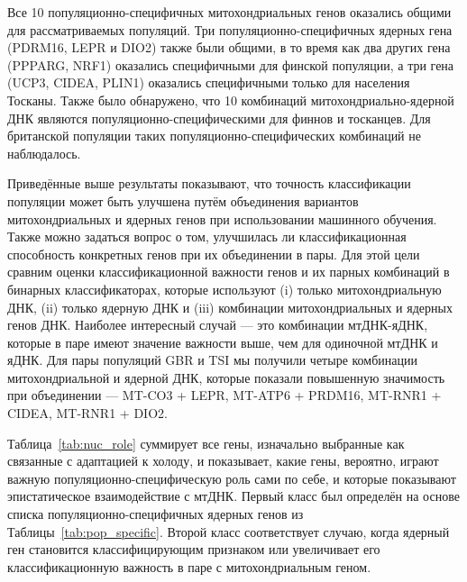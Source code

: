 Все 10 популяционно-специфичных митохондриальных генов оказались общими для рассматриваемых популяций. Три популяционно-специфичных ядерных гена (PDRM16, LEPR и DIO2) также были общими, в то время как два других гена (PPPARG, NRF1) оказались специфичными для финской популяции, а три гена (UCP3, CIDEA, PLIN1) оказались специфичными только для населения Тосканы. Также было обнаружено, что 10 комбинаций митохондриально-ядерной ДНК являются популяционно-специфическими для финнов и тосканцев. Для британской популяции таких популяционно-специфических комбинаций не наблюдалось.

Приведённые выше результаты показывают, что точность классификации популяции может быть улучшена путём объединения вариантов митохондриальных и ядерных генов при использовании машинного обучения. Также можно задаться вопрос о том, улучшилась ли классификационная способность конкретных генов при их объединении в пары. Для этой цели сравним оценки классификационной важности генов и их парных комбинаций в бинарных классификаторах, которые используют (i) только митохондриальную ДНК, (ii) только ядерную ДНК и (iii) комбинации митохондриальных и ядерных генов ДНК. Наиболее интересный случай --- это комбинации мтДНК-яДНК, которые в паре имеют значение важности выше, чем для одиночной мтДНК и яДНК. Для пары популяций GBR и TSI мы получили четыре комбинации митохондриальной и ядерной ДНК, которые показали повышенную значимость при объединении --- MT-CO3 + LEPR, MT-ATP6 + PRDM16, MT-RNR1 + CIDEA, MT-RNR1 + DIO2.
 
Таблица~\ref{tab:nuc_role} суммирует все гены, изначально выбранные как связанные с адаптацией к холоду, и показывает, какие гены, вероятно, играют важную популяционно-специфическую роль сами по себе, и которые показывают эпистатическое взаимодействие с мтДНК. Первый класс был определён на основе списка популяционно-специфичных ядерных генов из Таблицы~\ref{tab:pop_specific}. Второй класс соответствует случаю, когда ядерный ген становится классифицирующим признаком или увеличивает его классификационную важность в паре с митохондриальным геном.

